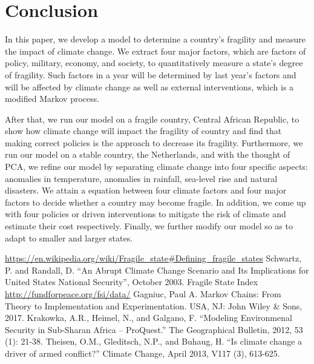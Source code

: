 \documentclass{mcmthesis}
\begin{document}
	\section{Conclusion}
		In this paper, we develop a model to determine a country's fragility and measure the impact of climate change. We extract four major factors, which are factors of policy, military, economy, and society, to quantitatively measure a state's degree of fragility. Such factors in a year will be determined by last year's factors and will be affected by climate change as well as external interventions, which is a modified Markov process. 
		
		After that, we run our model on a fragile country, Central African Republic, to show how climate change will impact the fragility of country and find that making correct policies is the approach to decrease its fragility. Furthermore, we run our model on a stable country, the Netherlands, and with the thought of PCA, we refine our model by separating climate change into four specific aspects:  anomalies in temperature, anomalies in rainfall, sea-level rise and natural disasters. We attain a equation between four climate factors and four major factors to decide whether a country may become fragile. In addition, we come up with four policies or driven interventions to mitigate the risk of climate and estimate their cost respectively. Finally, we further modify our model so as to adapt to smaller and larger states.
		
	\newpage
	\begin{thebibliography}{99}
		\url{https://en.wikipedia.org/wiki/Fragile_state#Defining_fragile_states}
		 Schwartz, P. and Randall, D. “An Abrupt Climate Change Scenario and Its Implications for United States National Security”, October 2003.
		 Fragile State Index \url{http://fundforpeace.org/fsi/data/}
		 Gagniuc, Paul A. Markov Chains: From Theory to Implementation and Experimentation. USA, NJ: John Wiley \& Sons, 2017.
		 Krakowka, A.R., Heimel, N., and Galgano, F. “Modeling Environmenal Security in Sub-Sharan Africa – ProQuest.” The Geographical Bulletin, 2012, 53 (1): 21-38.
		 Theisen, O.M., Gleditsch, N.P., and Buhaug, H. “Is climate change a driver of armed conflict?” Climate Change, April 2013, V117 (3), 613-625.
	\end{thebibliography}
	
\end{document}
